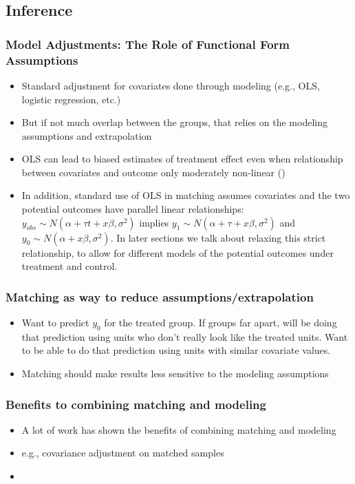 \documentclass[11pt,titlepage]{article}
\begin{document}
\subsection{Inference}
\subsubsection{Model Adjustments: The Role of Functional Form Assumptions}
\begin{itemize}
\item Standard adjustment for covariates done through modeling (e.g.,
  OLS, logistic regression, etc.)
\item But if not much overlap between the groups, that relies on the
  modeling assumptions and extrapolation
\item OLS can lead to biased estimates of treatment effect even when
  relationship between covariates and outcome only moderately
  non-linear (\cite{Rubin73a, Rubin73b})
\item In addition, standard use of OLS in matching assumes covariates
  and the two potential outcomes have parallel linear relationships:
  $y_{obs} \sim N(\alpha + \tau t + x \beta, \sigma^2)$ implies $y_1
  \sim N(\alpha + \tau + x \beta, \sigma^2)$ and $y_0 \sim N(\alpha +
  x \beta, \sigma^2)$.  In later sections we talk about relaxing this
  strict relationship, to allow for different models of the potential
  outcomes under treatment and control.
\end{itemize}


\subsubsection{Matching as way to reduce assumptions/extrapolation}
\begin{itemize}
\item Want to predict $y_0$ for the treated group.  If groups far
  apart, will be doing that prediction using units who don't really
  look like the treated units. Want to be able to do that prediction
  using units with similar covariate values.
\item Matching should make results less sensitive to the modeling
  assumptions
\end{itemize}

\subsubsection{Benefits to combining matching and modeling}
\begin{itemize}
\item A lot of work has shown the benefits of combining matching and
  modeling
\item e.g., covariance adjustment on matched samples
\item \cite{Rubin73b, RobRot95, AbaImb04}
\end{itemize}
                                                                                                                                                
\end{document}
